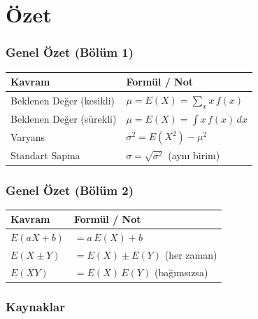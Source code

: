 ﻿\documentclass[light]{lutbeamer}
\begin{document}

\section{Özet}

\begin{frame}[fragile]
  \frametitle{Genel Özet (Bölüm 1)}
  \begin{center}
    \renewcommand{\arraystretch}{1.4}
    {\small
    \begin{tabular}{p{4.5cm}p{6.5cm}}
      \toprule
      \textbf{Kavram} & \textbf{Formül / Not} \\
      \midrule
      Beklenen Değer (kesikli) & $\mu = E(X) = \sum_x x\,f(x)$ \\
      Beklenen Değer (sürekli) & $\mu = E(X) = \int x\,f(x)\,dx$ \\
      \midrule
      Varyans & $\sigma^2 = E(X^2) - \mu^2$ \\
      Standart Sapma & $\sigma = \sqrt{\sigma^2}$ \; (aynı birim) \\
      \bottomrule
    \end{tabular}
    }
  \end{center}
\end{frame}

\begin{frame}[fragile]
  \frametitle{Genel Özet (Bölüm 2)}
  \begin{center}
    \renewcommand{\arraystretch}{1.4}
    {\small
    \begin{tabular}{p{4.5cm}p{6.5cm}}
      \toprule
      \textbf{Kavram} & \textbf{Formül / Not} \\
      \midrule
      $E(aX + b)$ & $= a\,E(X) + b$ \\
      \midrule
      $E(X \pm Y)$ & $= E(X) \pm E(Y)$ \; (her zaman) \\
      $E(XY)$ & $= E(X)\,E(Y)$ \; (bağımsızsa) \\
      \bottomrule
    \end{tabular}
    }
  \end{center}
\end{frame}

\begin{frame}[allowframebreaks]
  \frametitle{Kaynaklar}
  \nocite{walpole_ch4}
  \printbibliography{}
\end{frame}

\appendix
\end{document}

